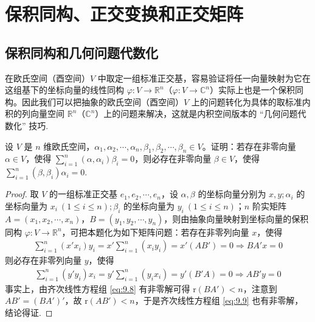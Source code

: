 \documentclass[../../main.tex]{subfiles}%
\begin{document}
\section{保积同构、正交变换和正交矩阵}

\subsection{保积同构和几何问题代数化}

在欧氏空间（酉空间）\(V\) 中取定一组标准正交基，容易验证将任一向量映射为它在这组基下的坐标向量的线性同构 \(\varphi:V\rightarrow\mathbb{R}^n\)（\(\varphi:V\rightarrow\mathbb{C}^n\)）实际上也是一个保积同构。因此我们可以把抽象的欧氏空间（酉空间）\(V\) 上的问题转化为具体的取标准内积的列向量空间 \(\mathbb{R}^n\)（\(\mathbb{C}^n\)）上的问题来解决，这就是内积空间版本的 “几何问题代数化” 技巧.

\begin{example}\label{example:例9.32}
设 \(V\) 是 \(n\) 维欧氏空间，\(\alpha_1,\alpha_2,\cdots,\alpha_n,\beta_1,\beta_2,\cdots,\beta_n\in V\)。证明：若存在非零向量 \(\alpha\in V\)，使得 \(\sum_{i = 1}^{n}(\alpha,\alpha_i)\beta_i = 0\)，则必存在非零向量 \(\beta\in V\)，使得 \(\sum_{i = 1}^{n}(\beta,\beta_i)\alpha_i = 0\).
\end{example}
\begin{proof}

取 \(V\) 的一组标准正交基 \(e_1,e_2,\cdots,e_n\)，设 \(\alpha,\beta\) 的坐标向量分别为 \(x,y\);$\,$\(\alpha_i\) 的坐标向量为 \(x_i\ (1\leqslant  i\leqslant  n)\);$\,$\(\beta_i\) 的坐标向量为 \(y_i\ (1\leqslant  i\leqslant  n)\)；\(n\) 阶实矩阵 \(A=(x_1,x_2,\cdots,x_n)\)，\(B=(y_1,y_2,\cdots,y_n)\)，则由抽象向量映射到坐标向量的保积同构 \(\varphi:V\rightarrow\mathbb{R}^n\)，可把本题化为如下矩阵问题：若存在非零列向量 \(x\)，使得
\begin{align}
\sum_{i = 1}^{n}(x'x_i)y_i = x'\sum_{i = 1}^{n}(x_iy_i) = x'(AB') =0 \Rightarrow BA'x = 0\label{eq:9.8}
\end{align}
则必存在非零列向量 \(y\)，使得
\begin{align}
\sum_{i = 1}^{n}(y'y_i)x_i = y'\sum_{i = 1}^{n}(y_ix_i) = y'(B'A) =0 \Rightarrow AB'y = 0\label{eq:9.9}
\end{align}
事实上，由齐次线性方程组 \eqref{eq:9.8} 有非零解可得 \(\mathrm{r}(BA') < n\)，注意到 \(AB'=(BA')'\)，故 \(\mathrm{r}(AB') < n\)，于是齐次线性方程组 \eqref{eq:9.9} 也有非零解，结论得证. 

\end{proof}
\end{document}
